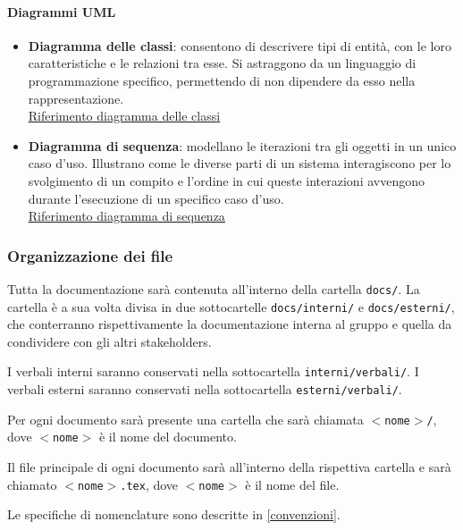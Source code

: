 \documentclass[a4paper, 12pt]{article}
\begin{document}
\paragraph{Diagrammi UML}
\begin{itemize}
	\item \textbf{Diagramma delle classi}: consentono di descrivere tipi di entità, con le loro caratteristiche e le
	relazioni tra esse. Si astraggono da un linguaggio di programmazione specifico, permettendo di non
	dipendere da esso nella rappresentazione.\\
	\href{https://www.math.unipd.it/~rcardin/swea/2021/Diagrammi%20delle%20Classi_4x4.pdf}{\underline{Riferimento diagramma delle classi}}
	\item \textbf{Diagramma di sequenza}: modellano le iterazioni tra gli oggetti in un unico caso d'uso. Illustrano come
	le diverse parti di un sistema interagiscono per lo svolgimento di un compito e l'ordine in cui queste interazioni
	avvengono durante l'esecuzione di un specifico caso d'uso.\\
	\href{https://www.math.unipd.it/~rcardin/swea/2022/Diagrammi%20di%20Sequenza.pdf}{\underline{Riferimento diagramma di sequenza}}

\end{itemize}

\subsubsection{Organizzazione dei file}
Tutta la documentazione sarà contenuta all'interno della cartella \texttt{docs/}. La cartella è a sua volta divisa in due sottocartelle \texttt{docs/interni/} e \texttt{docs/esterni/}, che conterranno rispettivamente la documentazione interna al gruppo e quella da condividere con gli altri stakeholders.

I verbali interni saranno conservati nella sottocartella \texttt{interni/verbali/}.
I verbali esterni saranno conservati nella sottocartella \texttt{esterni/verbali/}.

Per ogni documento sarà presente una cartella che sarà chiamata \texttt{$<$nome$>$/}, dove \texttt{$<$nome$>$} è il nome del documento.

Il file principale di ogni documento sarà all'interno della rispettiva cartella e sarà chiamato \texttt{$<$nome$>$.tex}, dove \texttt{$<$nome$>$} è il nome del file.

Le specifiche di nomenclature sono descritte in \ref{convenzioni}.
\end{document}

